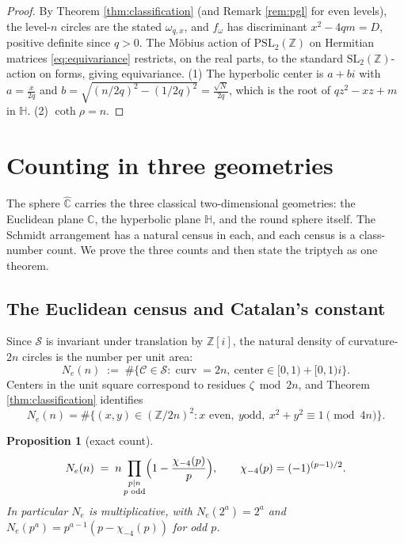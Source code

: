 \documentclass[11pt]{amsart}
\numberwithin{equation}{section}
\theoremstyle{plain}
\newtheorem{proposition}[theorem]{Proposition}
\theoremstyle{definition}
\theoremstyle{remark}
\newcommand{\C}{\mathbb{C}}
\newcommand{\Z}{\mathbb{Z}}
\newcommand{\HH}{\mathbb{H}}
\newcommand{\Zi}{\Z[i]}
\newcommand{\Chat}{\widehat{\C}}
\newcommand{\SL}{\mathrm{SL}}
\newcommand{\PSL}{\mathrm{PSL}}
\newcommand{\Sarr}{\mathcal{S}}
\begin{document}
\begin{proof}
By Theorem \ref{thm:classification} (and Remark \ref{rem:pgl} for even
levels), the level-$n$ circles are the stated $\omega_{q,x}$, and
$f_\omega$ has discriminant $x^2 - 4qm = D$, positive definite since
$q > 0$.  The M\"obius action of $\PSL_2(\Z)$ on Hermitian matrices
\eqref{eq:equivariance} restricts, on the real parts, to the standard
$\SL_2(\Z)$-action on forms, giving equivariance.  (1) The hyperbolic
center is $a + bi$ with $a = \tfrac{x}{2q}$ and
$b = \sqrt{(n/2q)^2 - (1/2q)^2} = \tfrac{\sqrt N}{2q}$, which is the root
of $qz^2 - xz + m$ in $\HH$.  (2) $\coth\rho = n$.
\end{proof}

\section{Counting in three geometries}\label{sec:counting}

The sphere $\Chat$ carries the three classical two-dimensional
geometries: the Euclidean plane $\C$, the hyperbolic plane $\HH$, and the
round sphere itself.  The Schmidt arrangement has a natural census in
each, and each census is a class-number count.  We prove the three counts
and then state the triptych as one theorem.

\subsection{The Euclidean census and Catalan's constant}
\label{subsec:euclid-count}

Since $\Sarr$ is invariant under translation by $\Zi$, the natural
density of curvature-$2n$ circles is the number per unit area:
\[
  N_e(n) \;:=\; \#\{\mathcal{C} \in \Sarr : \operatorname{curv} = 2n,\
  \text{center} \in [0,1) + [0,1)i\}.
\]
Centers in the unit square correspond to residues $\zeta \bmod 2n$, and
Theorem \ref{thm:classification} identifies
\begin{equation}\label{eq:Necong}
  N_e(n) = \#\bigl\{(x, y) \in (\Z/2n)^2 : x \text{ even},\ y \text{
  odd},\ x^2 + y^2 \equiv 1 \pmod{4n}\bigr\}.
\end{equation}

\begin{proposition}[exact count]\label{prop:Ne}
\[
  N_e(n) \;=\; n\prod_{\substack{p \mid n \\ p \text{ odd}}}
  \Bigl(1 - \frac{\chi_{-4}(p)}{p}\Bigr),
  \qquad
  \chi_{-4}(p) = (-1)^{(p-1)/2}.
\]
In particular $N_e$ is multiplicative, with $N_e(2^a) = 2^a$ and
$N_e(p^a) = p^{a-1}(p - \chi_{-4}(p))$ for odd $p$.
\end{proposition}
\end{document}
